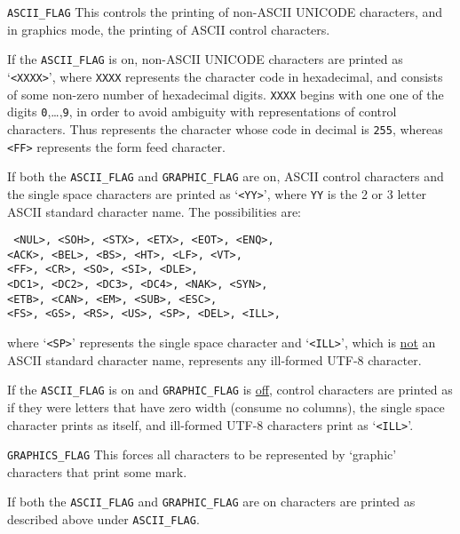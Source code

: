 \documentclass[12pt]{article}
\makeatletter
\newcommand{\ttnbmkey}[2]{{\tt #1}\index{#1@{\tt #1}!#2}}
\newenvironment{indpar}[1][0.3in]%
	{\begin{list}{}%
		     {\setlength{\itemsep}{0in}%
		      \setlength{\topsep}{0in}%
		      \setlength{\parsep}{1ex}%
		      \setlength{\labelwidth}{#1}%
		      \setlength{\leftmargin}{#1}%
		      \addtolength{\leftmargin}{\labelsep}}%
	 \item}%
	{\end{list}}
\newenvironment{itemlist}[1][1.2in]%
	{\begin{list}{}{\setlength{\labelwidth}{#1}%
		        \setlength{\leftmargin}{\labelwidth}%
		        \addtolength{\leftmargin}{+0.2in}%
		        \renewcommand{\makelabel}[1]{##1\hfill}}}%
	{\end{list}}
\makeatother
\begin{document}
\begin{indpar}\begin{itemlist}[1.4in]

\item[\ttnbmkey{ASCII\_FLAG}{{\tt min::printer\_parameters} flag}]
This controls the printing of non-ASCII UNICODE characters, and in
graphics mode, the printing of ASCII control characters.

If the {\tt ASCII\_FLAG} is on,
non-ASCII UNICODE characters are printed as `{\tt <XXXX>}', where
{\tt XXXX} represents the character code in hexadecimal,
and consists of some non-zero number of hexadecimal digits.
{\tt XXXX} begins with one
one of the digits {\tt 0},\dots,{\tt 9}, in order to avoid
ambiguity with representations of control characters.  Thus
{\tt <0FF>} represents the character whose code in decimal is
{\tt 255}, whereas {\tt <FF>} represents the form feed character.

If both the {\tt ASCII\_FLAG} and {\tt GRAPHIC\_FLAG} are on,
ASCII control characters and the single space characters are
printed as `{\tt <YY>}', where {\tt YY} is the 2 or 3 letter
ASCII standard character name.
The possibilities are:
\begin{indpar} \tt
    <NUL>, <SOH>, <STX>, <ETX>, <EOT>, <ENQ>, \\
    <ACK>, <BEL>, <BS>, <HT>, <LF>, <VT>, \\
    <FF>, <CR>, <SO>, <SI>, <DLE>, \\
    <DC1>, <DC2>, <DC3>, <DC4>, <NAK>, <SYN>, \\
    <ETB>, <CAN>, <EM>, <SUB>, <ESC>, \\
    <FS>, <GS>, <RS>, <US>, <SP>, <DEL>, <ILL>,
\end{indpar}

where `{\tt <SP>}' represents the single space character and
`{\tt <ILL>}', which is \underline{not} an ASCII standard character
name, represents any ill-formed UTF-8 character.

If the {\tt ASCII\_FLAG} is on
and {\tt GRAPHIC\_FLAG} is \underline{off}, control characters
are printed as if they were letters that have zero width (consume
no columns), the single space character prints as itself, and
ill-formed UTF-8 characters print as `{\tt <ILL>}'.

\item[\ttnbmkey{GRAPHICS\_FLAG}{{\tt min::printer\_parameters} flag}]
This forces all characters to be
represented by `graphic' characters that print some mark.

If both the {\tt ASCII\_FLAG} and {\tt GRAPHIC\_FLAG} are on
characters are printed as described above under
{\tt ASCII\_FLAG}.


\end{itemlist}
\end{indpar}
\end{document}
